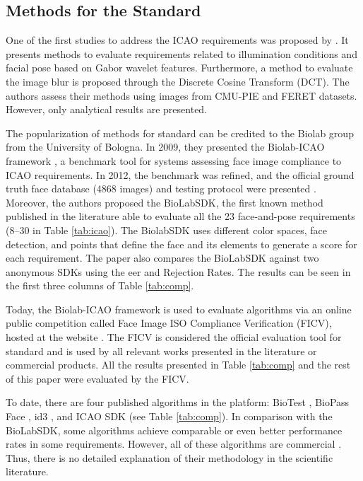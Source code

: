\subsection{Methods for the \icao Standard}

One of the first studies to address the ICAO requirements was proposed by \citet{sang2009face}. It presents methods to evaluate requirements related to illumination conditions and facial pose based on Gabor wavelet features. Furthermore, a method to evaluate the image blur is proposed through the Discrete Cosine Transform (DCT). The authors assess their methods using images from CMU-PIE and FERET datasets. However, only analytical results are presented.

The popularization of methods for \icao standard can be credited to the Biolab group from the University of Bologna. In 2009, they presented the Biolab-ICAO framework \citep{maltoni2009biolab}, a benchmark tool for systems assessing face image compliance to ICAO requirements. In 2012, the benchmark was refined, and the official ground truth face database (4868 images) and testing protocol were presented \citep{ferrara2012face}. Moreover, the authors proposed the BioLabSDK, the first known method published in the literature able to evaluate all the 23 face-and-pose requirements (8--30 in Table \ref{tab:icao}). The BiolabSDK uses different color spaces, face detection, and points that define the face and its elements to generate a score for each requirement. The paper also compares the BioLabSDK against two anonymous SDKs using the \acs{eer} and Rejection Rates. The results can be seen in the first three columns of Table \ref{tab:comp}.



Today, the Biolab-ICAO framework is used to evaluate algorithms via an online public competition called Face Image ISO Compliance Verification (FICV), hosted at the \fvcongoing website \citep{fvcongoing}. The FICV is considered the official evaluation tool for \icao standard and is used by all relevant works presented in the literature or commercial products. All the results presented in Table \ref{tab:comp} and the rest of this paper were evaluated by the FICV.

To date, there are four published algorithms in the \fvcongoing platform: BioTest \citep{fvcBioTest}, BioPass Face \citep{fvcVsoft}, id3 \citep{fvcICAOCompliance}, and ICAO SDK \citep{fvcSeamfix} (see Table \ref{tab:comp}). In comparison with the BioLabSDK, some algorithms achieve comparable or even better performance rates in some requirements. However, all of these algorithms are commercial \citep{biometrika, id3, seamfix, vsoft}. Thus, there is no detailed explanation of their methodology in the scientific literature.

